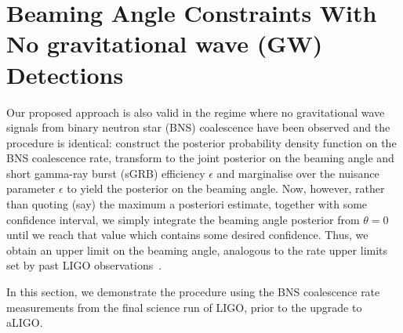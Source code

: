 \documentclass[twocolumn,nofootinbib]{revtex4-1}
\def\bns#1{binary neutron star#1 (BNS#1)\gdef\bns{BNS}}
\def\gw#1{gravitational wave#1 (GW#1)\gdef\gw{GW}}
\def\sgrb#1{short gamma-ray burst#1 (sGRB#1)\gdef\sgrb{sGRB}}
\begin{document}
\section{Beaming Angle Constraints With No \gw{} Detections}
\label{sec:beaming_limits}
Our proposed approach is also valid in the regime where no gravitational wave
signals from \bns{} coalescence have been observed and the procedure is
identical: construct the posterior probability density function on the \bns{}
coalescence rate, transform to the joint posterior on the beaming angle and
\sgrb{} efficiency $\epsilon$ and marginalise over the nuisance parameter
$\epsilon$ to yield the posterior on the beaming angle.  Now, however, rather
than quoting (say) the maximum a posteriori estimate, together with some
confidence interval, we simply integrate the beaming angle posterior from
$\theta=0$ until we reach that value which contains some desired confidence.
Thus, we obtain an upper limit on the beaming angle, analogous to the rate upper
limits set by past LIGO observations~\cite{S6lowmass}.

In this section, we demonstrate the procedure using the \bns{} coalescence rate
measurements from the final science run of LIGO, prior to the upgrade to aLIGO.
\end{document}
